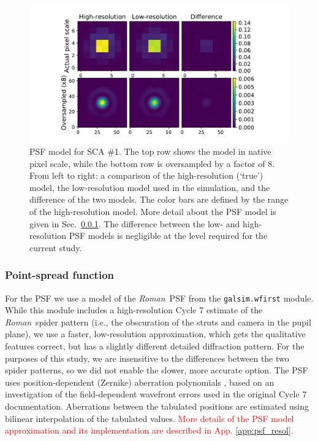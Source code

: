 \documentclass[usenatbib]{mnras}
\newcommand{\wfirst}{{\slshape Roman}}
\newcommand{\changetexttwo}[1]{\textcolor{red}{#1}}
\begin{document}
\begin{figure}
\begin{center}
\includegraphics[width=\columnwidth]{figures/psf.pdf}
\end{center}
\caption[]{
PSF model for SCA \#1. The top row shows the model in native pixel scale, while the bottom row is oversampled by a factor of 8. From left to right: a comparison of the high-resolution (`true') model, the low-resolution model used in the simulation, and the difference of the two models. The color bars are defined by the range of the high-resolution model. More detail about the PSF model is given in Sec.~\ref{psf}. The difference between the low- and high-resolution PSF models is negligible at the level required for the current study.
\label{fig:psf}}
\end{figure}

\subsubsection{Point-spread function}\label{psf}

For the PSF we use a model of the \wfirst\ PSF from the \texttt{galsim.wfirst} module.
While this module includes a high-resolution Cycle 7 estimate of the \wfirst\ spider pattern (i.e., the obscuration of the struts and camera in the pupil plane), we use a faster, low-resolution approximation, which gets the qualitative features correct, but has a slightly different detailed diffraction pattern. 
For the purposes of this study, we are insensitive to the differences between the two spider patterns, so we did not enable the slower, more accurate option.
The PSF uses position-dependent (Zernike) aberration polynomials \citep{noll1976}, based on an investigation of the field-dependent wavefront errors used in the original Cycle 7 documentation.
Aberrations between the tabulated positions are estimated using bilinear interpolation of the tabulated values. \changetexttwo{More details of the PSF model approximation and its implementation are described in App. \ref{app:psf_resol}.}
\end{document}

